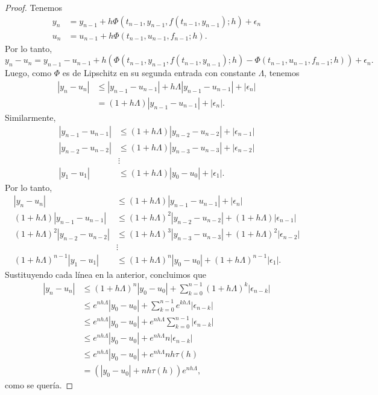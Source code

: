\documentclass[11pt]{article}
\begin{document}
\begin{proof}
  Tenemos
  \begin{align}
    y_n
    &= y_{n-1} + h\Phi(t_{n-1},y_{n-1},f(t_{n-1},y_{n-1});h)
    + \epsilon_n
    \\
    u_n
    &= u_{n-1} + h\Phi(t_{n-1},u_{n-1},f_{n-1};h)
  .\end{align}
  Por lo tanto,
  \begin{equation}
    y_n-u_n = y_{n-1}-u_{n-1}
    +
    h(
    \Phi(t_{n-1},y_{n-1},f(t_{n-1},y_{n-1});h)
    -\Phi(t_{n-1},u_{n-1},f_{n-1};h))
    + \epsilon_n
  .\end{equation}
  Luego, como $\Phi$ es de Lipschitz en su segunda entrada con
  constante $\Lambda$, tenemos
  \begin{align}
    |y_n-u_n|
    &\leq |y_{n-1}-u_{n-1}|
    + h\Lambda |y_{n-1} - u_{n-1}|
    + |\epsilon_n| \\
    &= (1+h\Lambda)|y_{n-1}-u_{n-1}|
    + |\epsilon_n|
  .\end{align}
  Similarmente,
  \begin{align}
    |y_{n-1}-u_{n-1}|
    &\leq (1+h\Lambda)|y_{n-2}-u_{n-2}| + |\epsilon_{n-1}| \\
    |y_{n-2}-u_{n-2}|
    &\leq (1+h\Lambda)|y_{n-3}-u_{n-3}| + |\epsilon_{n-2}| \\
    &\vdots \\
    |y_{1}-u_{1}|
    &\leq (1+h\Lambda)|y_{0}-u_{0}| + |\epsilon_{1}|
  .\end{align}
  Por lo tanto,
  \begin{align}
    |y_n-u_n|
    &\leq (1+h\Lambda)|y_{n-1}-u_{n-1}| + |\epsilon_n| \\
    (1+h\Lambda)|y_{n-1}-u_{n-1}|
    &\leq (1+h\Lambda)^{2}|y_{n-2}-u_{n-2}|
    + (1+h\Lambda)|\epsilon_{n-1}| \\
    (1+h\Lambda)^{2}|y_{n-2}-u_{n-2}|
    &\leq (1+h\Lambda)^{3}|y_{n-3}-u_{n-3}|
    + (1+h\Lambda)^{2}|\epsilon_{n-2}| \\
    &\vdots \\
    (1+h\Lambda)^{n-1}|y_{1}-u_{1}|
    &\leq (1+h\Lambda)^n|y_{0}-u_{0}|
    + (1+h\Lambda)^{n-1}|\epsilon_{1}|
  .\end{align}
  Sustituyendo cada línea en la anterior, concluimos que
  \begin{align}
    |y_n-u_n|
    &\leq (1+h\Lambda)^{n}|y_0-u_0|
    + \sum_{k=0}^{n-1}(1+h\Lambda)^{k}|\epsilon_{n-k}| \\
    &\leq e^{nh\Lambda}|y_0-u_0|
    + \sum_{k=0}^{n-1}e^{kh\Lambda}|\epsilon_{n-k}| \\
    &\leq e^{nh\Lambda}|y_0-u_0|
    + e^{nh\Lambda}\sum_{k=0}^{n-1}|\epsilon_{n-k}| \\
    &\leq e^{nh\Lambda}|y_0-u_0|
    + e^{nh\Lambda}n|\epsilon_{n-k}| \\
    &\leq e^{nh\Lambda}|y_0-u_0| + e^{nh\Lambda}nh\tau(h) \\
    &= (|y_0-u_0| + nh\tau(h))e^{nh\Lambda},
  \end{align}
  como se quería.
\end{proof}
\end{document}
